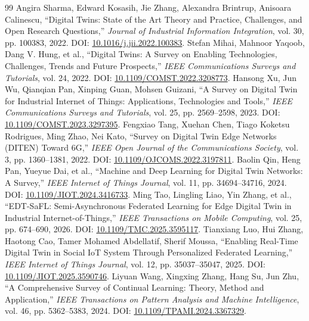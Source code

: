 \begin{thebibliography}{99}
 Angira Sharma, Edward Kosasih, Jie Zhang, Alexandra Brintrup, Anisoara Calinescu, ``Digital Twins: State of the Art Theory and Practice, Challenges, and Open Research Questions,'' \emph{Journal of Industrial Information Integration}, vol. 30, pp. 100383, 2022. DOI: \href{https://doi.org/10.1016/j.jii.2022.100383}{10.1016/j.jii.2022.100383}.
 Stefan Mihai, Mahnoor Yaqoob, Dang V. Hung, et al., ``Digital Twins: A Survey on Enabling Technologies, Challenges, Trends and Future Prospects,'' \emph{IEEE Communications Surveys and Tutorials}, vol. 24, 2022. DOI: \href{https://doi.org/10.1109/COMST.2022.3208773}{10.1109/COMST.2022.3208773}.
 Hansong Xu, Jun Wu, Qianqian Pan, Xinping Guan, Mohsen Guizani, ``A Survey on Digital Twin for Industrial Internet of Things: Applications, Technologies and Tools,'' \emph{IEEE Communications Surveys and Tutorials}, vol. 25, pp. 2569--2598, 2023. DOI: \href{https://doi.org/10.1109/COMST.2023.3297395}{10.1109/COMST.2023.3297395}.
 Fengxiao Tang, Xuehan Chen, Tiago Koketsu Rodrigues, Ming Zhao, Nei Kato, ``Survey on Digital Twin Edge Networks (DITEN) Toward 6G,'' \emph{IEEE Open Journal of the Communications Society}, vol. 3, pp. 1360--1381, 2022. DOI: \href{https://doi.org/10.1109/OJCOMS.2022.3197811}{10.1109/OJCOMS.2022.3197811}.
 Baolin Qin, Heng Pan, Yueyue Dai, et al., ``Machine and Deep Learning for Digital Twin Networks: A Survey,'' \emph{IEEE Internet of Things Journal}, vol. 11, pp. 34694--34716, 2024. DOI: \href{https://doi.org/10.1109/JIOT.2024.3416733}{10.1109/JIOT.2024.3416733}.
 Ming Tao, Lingling Liao, Yin Zhang, et al., ``EDT-SaFL: Semi-Asynchronous Federated Learning for Edge Digital Twin in Industrial Internet-of-Things,'' \emph{IEEE Transactions on Mobile Computing}, vol. 25, pp. 674--690, 2026. DOI: \href{https://doi.org/10.1109/TMC.2025.3595117}{10.1109/TMC.2025.3595117}.
 Tianxiang Luo, Hui Zhang, Haotong Cao, Tamer Mohamed Abdellatif, Sherif Moussa, ``Enabling Real-Time Digital Twin in Social IoT System Through Personalized Federated Learning,'' \emph{IEEE Internet of Things Journal}, vol. 12, pp. 35037--35047, 2025. DOI: \href{https://doi.org/10.1109/JIOT.2025.3590746}{10.1109/JIOT.2025.3590746}.
 Liyuan Wang, Xingxing Zhang, Hang Su, Jun Zhu, ``A Comprehensive Survey of Continual Learning: Theory, Method and Application,'' \emph{IEEE Transactions on Pattern Analysis and Machine Intelligence}, vol. 46, pp. 5362--5383, 2024. DOI: \href{https://doi.org/10.1109/TPAMI.2024.3367329}{10.1109/TPAMI.2024.3367329}.

\end{thebibliography}
